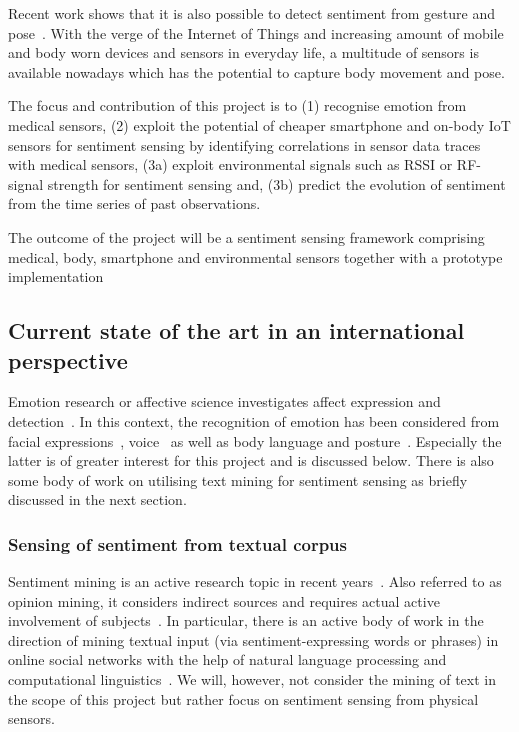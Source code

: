 \documentclass[12pt]{article}
\begin{document}
Recent work shows that it is also possible to detect sentiment from gesture and pose~\cite{Emotion_DeMeijer_1989}. 
With the verge of the Internet of Things and increasing amount of mobile and body worn devices and sensors in everyday life, a multitude of sensors is available nowadays which has the potential to capture body movement and pose. 

The focus and contribution of this project is to (1) recognise emotion from medical sensors, (2) exploit the potential of cheaper smartphone and on-body IoT sensors for sentiment sensing by identifying correlations in sensor data traces with medical sensors, (3a) exploit environmental signals such as RSSI or RF-signal strength for sentiment sensing and, (3b) predict the evolution of sentiment from the time series of past observations. 

The outcome of the project will be a sentiment sensing framework comprising medical, body, smartphone and environmental sensors together with a prototype implementation

\subsection*{Current state of the art in an international perspective}
Emotion research or affective science investigates affect expression and detection~\cite{SentimentSensing_Calvo_2010}.
In this context, the recognition of emotion has been considered from facial expressions~\cite{SentimentSensing_Ekman_2003}, voice~\cite{SentimentSensing_Juslin_2005} as well as body language and posture~\cite{SentimentSensing_Mota_2003,SentimentSesing_Mello_2009}.
Especially the latter is of greater interest for this project and is discussed below. 
There is also some body of work on utilising text mining for sentiment sensing as briefly discussed in the next section.

\subsubsection*{Sensing of sentiment from textual corpus}
Sentiment mining is an active research topic in recent years~\cite{SentimentSensing_Kramer_2014, SentimentSensing_Cambria_2013}. 
Also referred to as opinion mining, it considers indirect sources and requires actual active involvement of subjects~\cite{SentimentSensing_Pang_2008, SentimentSensing_Zhai_2011}. 
In particular, there is an active body of work in the direction of mining textual input (via sentiment-expressing words or phrases) in online social networks with the help of natural language processing and computational linguistics~\cite{SentimentSensing_Liu_2012}.
We will, however, not consider the mining of text in the scope of this project but rather focus on sentiment sensing from physical sensors.
\end{document}
